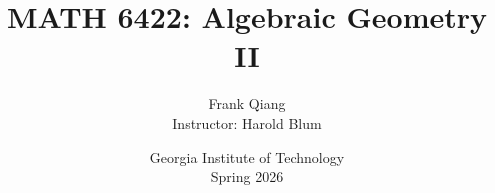 \documentclass[12pt, letterpaper, oneside]{book}
\title{MATH 6422: Algebraic Geometry II}
\author{Frank Qiang\\Instructor: Harold Blum}
\date{Georgia Institute of Technology\\Spring 2026}
\theoremstyle{definition}
\begin{document}
  \maketitle

  \begingroup
  \let\cleardoublepage\clearpage
  \tableofcontents
  \endgroup

  
  
  
  
  
  
  
  
  
  
  
  
  
  
  
  
  
  
  
  
  
  
  
  
  
  
  
  
\end{document}
